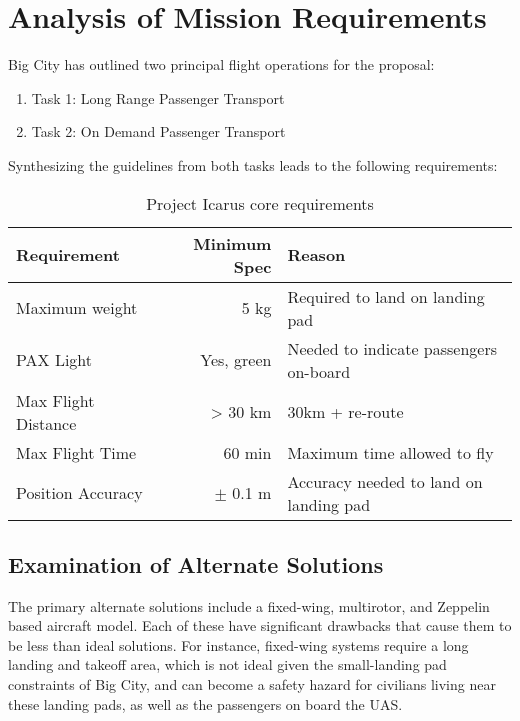 \section{Analysis of Mission Requirements}
\label{sec:analysis}

Big City has outlined two principal flight operations for the proposal:
\begin{enumerate}
    \item Task 1: Long Range Passenger Transport
    \item Task 2: On Demand Passenger Transport
\end{enumerate}
Synthesizing the guidelines from both tasks leads to the following requirements:

\begin{table}[h]
\centering
\begin{tabular}{lrl}
\color{hyperrideblue} \textbf{Requirement} &
\color{hyperrideblue} \textbf{Minimum Spec} &
\color{hyperrideblue} \textbf{Reason}                   \\ \midrule
    Maximum weight       & 5 kg           & Required to land on landing pad        \\
PAX Light            & Yes, green    & Needed to indicate passengers on-board \\
Max Flight Distance  & > 30 km       & 30km + re-route                        \\
Max Flight Time      & 60 min        & Maximum time allowed to fly            \\
Position Accuracy    & $\pm$ 0.1 m   & Accuracy needed to land on landing pad
\end{tabular}
\caption{Project Icarus core requirements}
\end{table}

\subsection{Examination of Alternate Solutions}
\label{sec:alternate-solutions}

The primary alternate solutions include a fixed-wing, multirotor, and Zeppelin
based aircraft model. Each of these have significant drawbacks that cause them
to be less than ideal solutions. For instance, fixed-wing systems require a
long landing and takeoff area, which is not ideal given the small-landing pad
constraints of Big City, and can become a safety hazard for civilians living
near these landing pads, as well as the passengers on board the UAS.


